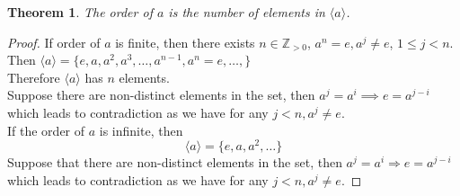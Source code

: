 \documentclass{article}
\theoremstyle{MyNonumberplain}
\theoremstyle{break}
\newtheorem*{proof}{Proof. }
\newcommand{\cyclic}[1]{\langle #1 \rangle}
\theoremstyle{break}
\newtheorem{theorem}{Theorem}[section]
\theoremstyle{break}
\theoremstyle{definition}
\theoremstyle{break}
\begin{document}
\begin{thmbox}
    \begin{theorem}
        The order of $a$ is the number of elements in $\cyclic{a}$.
    \end{theorem}    
    \begin{prfbox}
        \begin{proof}
            If order of $a$ is finite, then there exists $n \in \mathbb{Z}_{> 0}$, $a^n = e, a^j \neq
            e$, $1 \leq j < n$.\\

            Then $\cyclic{a} = \{ e, a, a^2, a^3, \ldots, a^{n - 1}, a^n = e, \ldots, \}$\\

            Therefore $\cyclic{a}$ has $n$ elements.\\

            Suppose there are non-distinct elements in the set, then $a^j = a^i
            \implies e = a^{j - i}$ which leads to contradiction as we have for any $j
            < n, a^j \neq e$.\\

            If the order of $a$ is infinite, then
            \[ \cyclic{a} = \{ e, a, a^2, \ldots \} \]
            Suppose that there are non-distinct elements in the set, then $a^j = a^i
            \Rightarrow e = a^{j - i}$ which leads to contradiction as we have for any $j
            < n, a^j \neq e$.
        \end{proof}
    \end{prfbox}
\end{thmbox}
\end{document}
